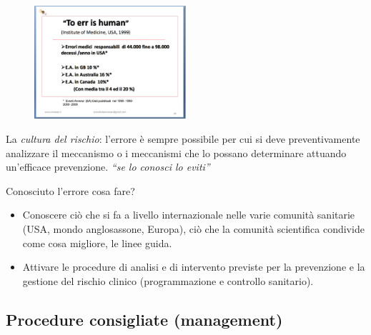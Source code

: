 \begin{figure}[!ht]
\centering
	\includegraphics[width=0.5\textwidth]{30/image3.png}
	\end{figure}

La
\emph{cultura del rischio}: l'errore è sempre possibile per cui si deve
preventivamente analizzare il meccanismo o i meccanismi che lo possano
determinare attuando un'efficace prevenzione. \emph{``se lo conosci lo
eviti''}

Conosciuto l'errore cosa fare?

\begin{itemize}
\item
  Conoscere ciò che si fa a livello internazionale nelle varie comunità
  sanitarie (USA, mondo anglosassone, Europa), ciò che la comunità
  scientifica condivide come cosa migliore, le linee guida.
\item
  Attivare le procedure di analisi e di intervento previste per la
  prevenzione e la gestione del rischio clinico (programmazione e
  controllo sanitario).
\end{itemize}

\subsection{Procedure consigliate (management)}

